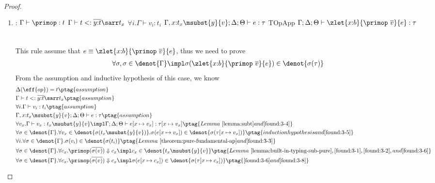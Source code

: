 \begin{proof}
\begin{enumerate}[label=Case]
\item:
{\footnotesize
\mprooftr{58mm}
{
$\Gamma \vdash \primop : t$ \quad $\Gamma \vdash t <: \overline{y{:}t}\sarr t_x$
$\forall i. \Gamma \vdash v_i : t_i$ \quad
$\Gamma, x{:}t_x\msubst{y}{v};\Delta;\Theta \vdash e : \tau$
}
{TOpApp}
{$\Gamma;\Delta;\Theta \vdash \zlet{x{:}b}{\primop\ \overline{v}}{e} : \tau$}
\ \\ \ \\}
This rule assume that $e \equiv \zlet{x{:}b}{\primop\ \overline{v}}{e}$, thus we need to prove
{\footnotesize\begin{align*}
    \forall \sigma, \sigma \in \denot{\Gamma} \impl \sigma(\zlet{x{:}b}{\primop\ \overline{v}}{e}) \in \denot{\sigma(\tau)}
\end{align*}}\noindent
From the assumption and inductive hypothesis of this case, we know
{\footnotesize\begin{alignat}{2}
\setcounter{equation}{0}
&\Delta(\eff{op}) = t \ptag{assumption} \label{found:3-1} \\
&\Gamma \vdash t <: \overline{y{:}t}\sarr t_x \ptag{assumption} \label{found:3-2} \\
&\forall i. \Gamma \vdash v_i : t_i \ptag{assumption} \label{found:3-3} \\
&\Gamma, x{:}t_x\msubst{y}{v};\Delta;\Theta \vdash e : \tau \ptag{assumption} \label{found:3-4} \\
&\forall v_x. \Gamma \vdash v_x : t_x\msubst{y}{v} \impl \Gamma;\Delta;\Theta \vdash e[x\mapsto v_x] : \tau[x\mapsto v_x] \ptag{Lemma~\ref{lemma:subt} and \ref{found:3-4}} \label{found:3-5} \\
&\forall \sigma \in \denot{\Gamma}. \forall v_x \in \denot{\sigma(t_x\msubst{y}{v})}. \sigma(e[x\mapsto v_x]) \in \denot{\sigma(\tau[x\mapsto v_x])} \ptag{induction hypothesis and \ref{found:3-5}} \label{found:3-6}
\\& \forall i. \forall \sigma\in\denot{\Gamma}. \sigma(v_i) \in\denot{\sigma(t_i)} \ptag{Lemma~\ref{theorem:pure-fundamental-ap} and \ref{found:3-3}} \label{found:3-7}
\\& \forall \sigma\in\denot{\Gamma}. \forall c_x. \primop(\overline{\sigma(v)}) \Downarrow c_x \impl c_x \in \denot{t_x\msubst{y}{v}} \ptag{Lemma~\ref{lemma:built-in-typing-sub-pure}, \ref{found:3-1}, \ref{found:3-2}, and \ref{found:3-6}} \label{found:3-8}
\\& \forall \sigma\in\denot{\Gamma}. \forall c_x. \primop(\overline{\sigma(v)}) \Downarrow c_x \impl \sigma(e[x\mapsto c_x]) \in \denot{\sigma(\tau[x\mapsto c_x])} \ptag{\ref{found:3-6} and \ref{found:3-8}} \label{found:3-9}

\end{alignat}}
\end{enumerate}
\end{proof}
